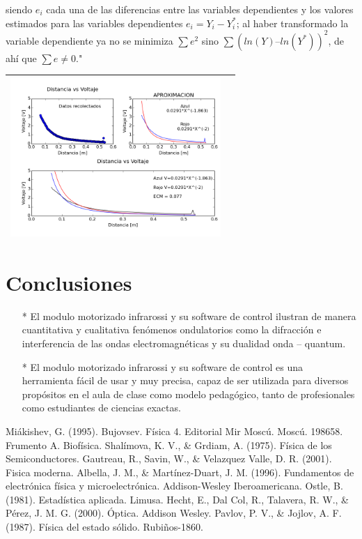 \documentclass[12]{article}
\newenvironment{Figure}
{\par\medskip\noindent\minipage{\linewidth}}
{\endminipage\par\medskip}
\begin{document}
\begin{multicols}{2}
siendo $e_{i}$ cada una de las diferencias entre las variables dependientes y los valores estimados para las variables dependientes $e_{i} = Y_{i} - Y^{*}_{i}$; al haber transformado la variable dependiente ya no se minimiza $\sum e^{2}$ sino $\sum (ln(Y) – ln(Y^{*}))^{2}$, de ahí que $\sum e \neq 0$."\cite{ESTADISTICA}
\begin{Figure}	
\center
\begin{tabular}{|l|r|}
\hline
\includegraphics[width=8cm, height=6cm]{img/Atenuacion.png} \\ \hline
\end{tabular}
\label{fig:g1}
\end{Figure}

\section{Conclusiones}
\begin{enumerate}
\item[*] El modulo motorizado infrarossi y su software de control ilustran de manera cuantitativa y cualitativa fenómenos ondulatorios como la difracción e interferencia de las ondas electromagnéticas y su dualidad onda – quantum.   

\item[*] El modulo motorizado infrarossi y su software de control es una herramienta fácil de usar y muy precisa, capaz de ser utilizada para diversos propósitos en el aula de clase como modelo pedagógico,  tanto de profesionales como estudiantes de ciencias exactas.
\end{enumerate}


\begin{thebibliography}{99}
 Miákishev, G. (1995). Bujovsev. Física 4. Editorial Mir Moscú. Moscú. 198658. Frumento A. Biofísica.
 Shalímova, K. V., \& Grdiam, A. (1975). Física de los Semiconductores.
 Gautreau, R., Savin, W., \& Velazquez Valle, D. R. (2001). Fisica moderna.
 Albella, J. M., \& Martínez-Duart, J. M. (1996). Fundamentos de electrónica física y microelectrónica. Addison-Wesley Iberoamericana.
 Ostle, B. (1981). Estadística aplicada. Limusa.
 Hecht, E., Dal Col, R., Talavera, R. W., \& Pérez, J. M. G. (2000). Óptica. Addison Wesley.
 Pavlov, P. V., \& Jojlov, A. F. (1987). Física del estado sólido. Rubiños-1860.



\end{thebibliography}
\end{multicols}
\end{document}
